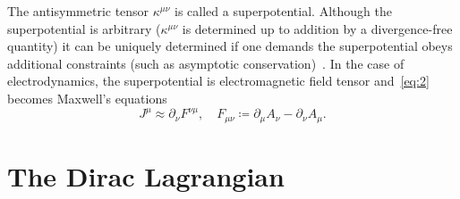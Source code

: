 \documentclass[11pt, a4paper]{article}
\begin{document}
The antisymmetric tensor $\kappa^{\mu\nu}$ is called a superpotential.
Although the superpotential is arbitrary ($\kappa^{\mu\nu}$
is determined up to addition by a divergence-free quantity) 
it can be uniquely determined if
one demands the superpotential obeys additional constraints
(such as asymptotic conservation)~\cite{SuperPot}. In the case of electrodynamics,
the superpotential is electromagnetic field tensor and~\eqref{eq:2}
becomes Maxwell's equations
\begin{equation}
  J^\mu \approx \partial_\nu F^{\nu\mu},
  \quad F_{\mu\nu} \coloneq \partial_{\mu}A_{\nu} - \partial_{\nu}A_{\mu}.
\end{equation}


\section{The Dirac Lagrangian}
\end{document}
